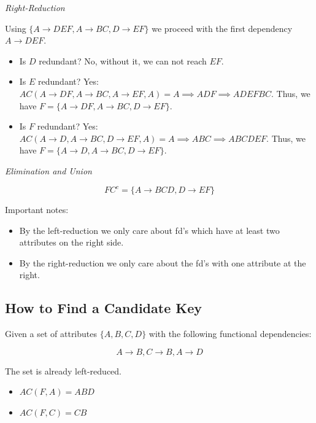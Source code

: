 \emph{Right-Reduction}

Using \(\{A \to DEF, A \to BC, D \to EF\}\) we proceed with the first dependency 
\(A \to DEF\).

\begin{itemize}
    
    \item Is \(D\) redundant? No, without it, we can not reach \(EF\).
    
    \item Is \(E\) redundant? Yes: \(AC(A \to DF, A \to BC, A \to EF, A) = A \implies ADF \implies ADEFBC\).  
    Thus, we have \(F = \{A \to DF, A \to BC, D \to EF\}\).
    
    \item Is \(F\) redundant? Yes: \(AC(A \to D, A \to BC, D \to EF, A) = A \implies ABC \implies ABCDEF\).  
    Thus, we have \(F = \{A \to D, A \to BC, D \to EF\}\).

\end{itemize}

\emph{Elimination and Union}

\[
    FC^c = \{A \to BCD, D \to EF\}
\]

Important notes:

\begin{itemize}
    
    \item By the left-reduction we only care about fd's which have at least two attributes on the right side.
    
    \item By the right-reduction we only care about the fd's with one attribute at the right.

\end{itemize}

\subsection{How to Find a Candidate Key}

Given a set of attributes \(\{A,B,C,D\}\) with the following functional dependencies:

\[
    A \to B, C \to B, A \to D
\]

The set is already left-reduced. 

\begin{itemize} 
   
    \item \(AC(F, A) = ABD\)
    
    \item \(AC(F, C) = CB\)

\end{itemize}

